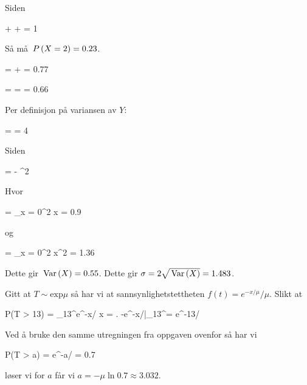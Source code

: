 \oppgave
\deloppgave
Siden
\begin{utregning}
	 +  +  = 1
\end{utregning}
Så må $\,P\left(X = 2\right) = 0.23$.

\deloppgave
\begin{utregning}
	 =  +  = 0.77
\end{utregning}

\deloppgave
\begin{utregning}
	 =  =  = 0.66
\end{utregning}

\deloppgave
Per definisjon på variansen av $Y$:
\begin{utregning}
	 =  = 4
\end{utregning}
Siden
\begin{utregning}
	 =  - ^2
\end{utregning}
Hvor
\begin{likning}
	 = \sum_{x = 0}^2 x = 0.9
\end{likning}
og
\begin{likning}
	 = \sum_{x = 0}^2 x^2 = 1.36
\end{likning}
Dette gir $\, \mathrm{Var}\left(X\right) = 0.55$. Dette gir $\sigma = 2\sqrt{\, \mathrm{Var}\left(X\right)} = 1.483$.

\oppgave
\deloppgave
Gitt at $T \sim \mathrm{exp}{\mu}$ så har vi at sannsynlighetstettheten $f(t) = e^{-x/\mu}/\mu$. Slikt at
\begin{utregning}
	P(T > 13) = \int_{13}^\infty e^{-x/\mu} \dd x = \left. -e^{-x/\mu}\right|_{13}^\infty = e^{-13/\mu} 
\end{utregning}

\deloppgave
Ved å bruke den samme utregningen fra oppgaven ovenfor så har vi
\begin{utregning}
	P(T > a) = e^{-a/\mu} = 0.7
\end{utregning}
løser vi for $a$ får vi $a = -\mu \ln 0.7 \approx 3.032$.

